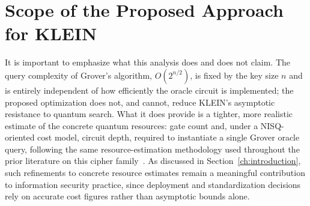 \section{Scope of the Proposed Approach for KLEIN}
It is important to emphasize what this analysis does and does not claim. The
query complexity of Grover's algorithm, $O(2^{n/2})$, is fixed by the key
size $n$ and is entirely independent of how efficiently the oracle circuit is
implemented; the proposed optimization does not, and cannot, reduce KLEIN's
asymptotic resistance to quantum search. What it does provide is a tighter,
more realistic estimate of the concrete quantum resources: gate count and,
under a NISQ-oriented cost model, circuit depth, required to instantiate a
single Grover oracle query, following the same resource-estimation
methodology used throughout the prior literature on this cipher
family~\cite{cryptoeprint:2026/1007}. As discussed in
Section~\ref{ch:introduction}, such refinements to concrete
resource estimates remain a meaningful contribution to information security
practice, since deployment and standardization decisions rely on accurate
cost figures rather than asymptotic bounds alone.